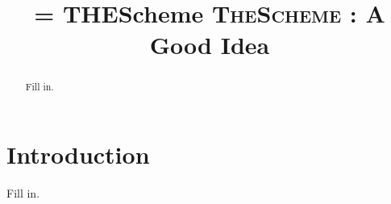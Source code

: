 \documentclass[sigplan,anonymous,review,10pt]{acmart}
\makeatletter
\DeclareRobustCommand{\Name}{%
  \ifnum\pdf@strcmp{\f@family}{\sfdefault}=\z@
    THEScheme\xspace%
  \else
    \textsc{TheScheme}\xspace%
  \fi
}
\makeatother
\begin{document}
\title{\Name: A Good Idea}

\author{}
\affiliation{}
\email{}

\begin{abstract}
Fill in.
\end{abstract}




\keywords{}


\maketitle

\renewcommand{\shortauthors}{CONF Submission \#XXX - Please keep confidential!}

\section{Introduction}

Fill in.



\end{document}
